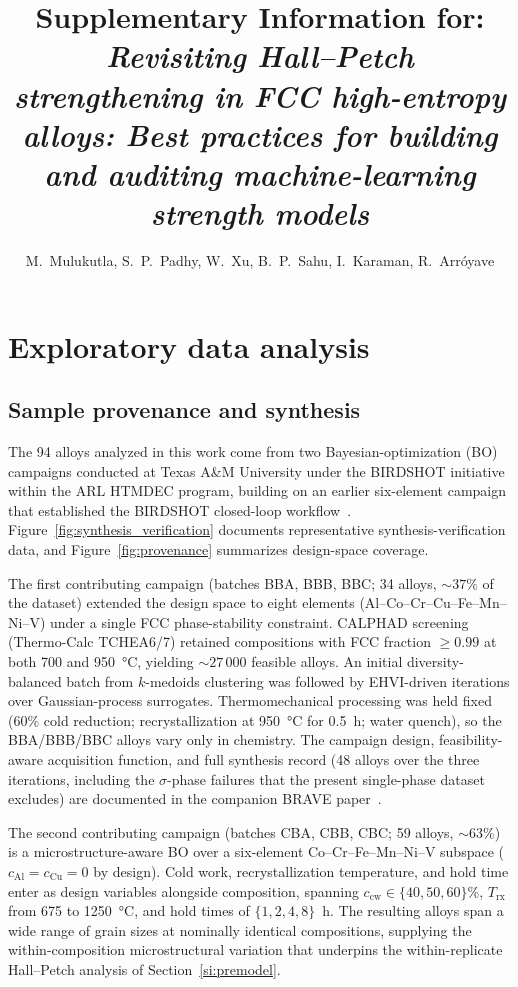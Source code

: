 \documentclass[11pt]{article}
\title{Supplementary Information for:\\
\emph{Revisiting Hall--Petch strengthening in FCC high-entropy alloys: Best practices for building and auditing machine-learning strength models}}
\author{M.~Mulukutla, S.~P.~Padhy, W.~Xu, B.~P.~Sahu, I.~Karaman, R.~Arr\'{o}yave}
\date{}
\begin{document}
\maketitle
\tableofcontents

\section{Exploratory data analysis}
\label{si:eda}

\subsection{Sample provenance and synthesis}

The 94 alloys analyzed in this work come from two Bayesian-optimization (BO) campaigns conducted at Texas A\&M University under the BIRDSHOT initiative within the ARL HTMDEC program, building on an earlier six-element campaign that established the BIRDSHOT closed-loop workflow~\cite{Mulukutla2024BIRDSHOT,Hastings2025FCC}. Figure~\ref{fig:synthesis_verification} documents representative synthesis-verification data, and Figure~\ref{fig:provenance} summarizes design-space coverage.

The first contributing campaign (batches BBA, BBB, BBC; 34 alloys, ${\sim}37\%$ of the dataset) extended the design space to eight elements (Al--Co--Cr--Cu--Fe--Mn--Ni--V) under a single FCC phase-stability constraint. CALPHAD screening (Thermo-Calc TCHEA6/7) retained compositions with FCC fraction ${\geq}0.99$ at both 700 and 950~\si{\degreeCelsius}, yielding ${\sim}27\,000$ feasible alloys. An initial diversity-balanced batch from $k$-medoids clustering was followed by EHVI-driven iterations over Gaussian-process surrogates. Thermomechanical processing was held fixed (60\% cold reduction; recrystallization at 950~\si{\degreeCelsius} for 0.5~h; water quench), so the BBA/BBB/BBC alloys vary only in chemistry. The campaign design, feasibility-aware acquisition function, and full synthesis record (48 alloys over the three iterations, including the $\sigma$-phase failures that the present single-phase dataset excludes) are documented in the companion BRAVE paper~\cite{Mulukutla2026BRAVE}.

The second contributing campaign (batches CBA, CBB, CBC; 59 alloys, ${\sim}63\%$) is a microstructure-aware BO over a six-element Co--Cr--Fe--Mn--Ni--V subspace ($c_\text{Al} = c_\text{Cu} = 0$ by design). Cold work, recrystallization temperature, and hold time enter as design variables alongside composition, spanning $c_\text{cw} \in \{40, 50, 60\}\%$, $T_\text{rx}$ from 675 to 1250~\si{\degreeCelsius}, and hold times of $\{1, 2, 4, 8\}$~h. The resulting alloys span a wide range of grain sizes at nominally identical compositions, supplying the within-composition microstructural variation that underpins the within-replicate Hall--Petch analysis of Section~\ref{si:premodel}.
\end{document}
